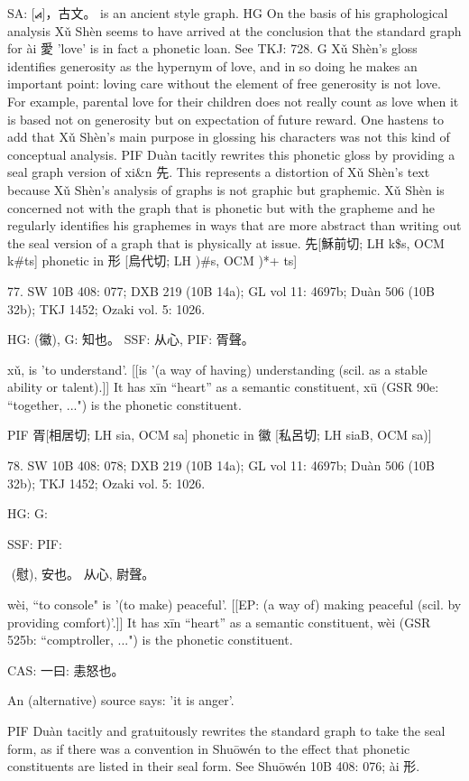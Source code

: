 SA:    [⦯]，古文。  is an ancient style graph.
HG    On the basis of his graphological analysis Xǔ Shèn seems to have arrived at the conclusion that the standard graph for ài 愛 'love' is in fact a phonetic loan. See TKJ: 728.
G Xǔ Shèn's gloss identifies generosity as the hypernym of love, and in so doing he makes an important point: loving care without the element of free generosity is not love. For example, parental love for their children does not really count as love when it is based not on generosity but on expectation of future reward. One hastens to add that Xǔ Shèn's main purpose in glossing his characters was not this kind of conceptual analysis.
PIF Duàn tacitly rewrites this phonetic gloss by providing a seal graph version of xi&n 先. This represents a distortion of Xǔ Shèn's text because Xǔ Shèn's analysis of graphs is not graphic but graphemic. Xǔ Shèn is concerned not with the graph that is phonetic but with the grapheme and he regularly identifies his graphemes in ways that are more abstract than writing out the seal version of a graph that is physically at issue.
先[穌前切; LH k\$s, OCM k\#ts] phonetic in 形 [烏代切; LH )\#s, OCM )*+ ts]

77. SW 10B 408: 077; DXB 219 (10B 14a); GL vol 11: 4697b; Duàn 506 (10B 32b); TKJ 1452; Ozaki vol. 5: 1026.


HG:	(徽),
G:	知也。
SSF: 从心,
PIF: 胥聲。

xǔ,
is 'to understand'. [[is '(a way of having) understanding (scil. as a stable ability or talent).]]
It has xīn ``heart'' as a semantic constituent,
xū (GSR 90e: ``together, ...") is the phonetic constituent.

PIF     胥[相居切; LH sia, OCM sa] phonetic in 徽 [私呂切; LH siaB, OCM sa)]

78. SW 10B 408: 078; DXB 219 (10B 14a); GL vol 11: 4697b; Duàn 506 (10B 32b); TKJ 1452; Ozaki vol. 5: 1026.


HG:
G:

SSF: PIF:

 (慰),
安也。
从心, 尉聲。


wèi, ``to console"
is '(to make) peaceful'. [[EP: (a way of) making peaceful (scil. by providing comfort)'.]]
It has xīn ``heart'' as a semantic constituent,
wèi (GSR 525b: ``comptroller, ...") is the phonetic constituent.

CAS: 一曰:
恚怒也。

An (alternative) source says: 'it is anger'.

PIF    Duàn tacitly and gratuitously rewrites the standard graph to take the seal form, as if there was a convention in Shuōwén to the effect that phonetic constituents are listed in their seal form. See Shuōwén 10B 408: 076; ài 形.



